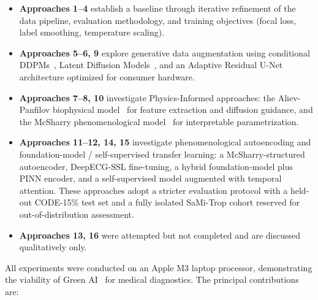 \begin{itemize}
    \item \textbf{Approaches 1--4} establish a baseline through iterative refinement of the data pipeline, evaluation methodology, and training objectives (focal loss, label smoothing, temperature scaling).
    \item \textbf{Approaches 5--6, 9} explore generative data augmentation using conditional DDPMs~\cite{ho2020denoising}, Latent Diffusion Models~\cite{rombach2022highresolution}, and an Adaptive Residual U-Net architecture optimized for consumer hardware.
    \item \textbf{Approaches 7--8, 10} investigate Physics-Informed approaches: the Aliev-Panfilov biophysical model~\cite{aliev1996simple} for feature extraction and diffusion guidance, and the McSharry phenomenological model~\cite{mcsharry2003dynamical} for interpretable parametrization.
    \item \textbf{Approaches 11--12, 14, 15} investigate phenomenological autoencoding and foundation-model / self-supervised transfer learning: a McSharry-structured autoencoder, DeepECG-SSL fine-tuning, a hybrid foundation-model plus PINN encoder, and a self-supervised model augmented with temporal attention. These approaches adopt a stricter evaluation protocol with a held-out CODE-15\% test set and a fully isolated SaMi-Trop cohort reserved for out-of-distribution assessment.
    \item \textbf{Approaches 13, 16} were attempted but not completed and are discussed qualitatively only.
\end{itemize}

All experiments were conducted on an Apple M3 laptop processor, demonstrating the viability of Green AI~\cite{lapicque2025greenai} for medical diagnostics. The principal contributions are:

